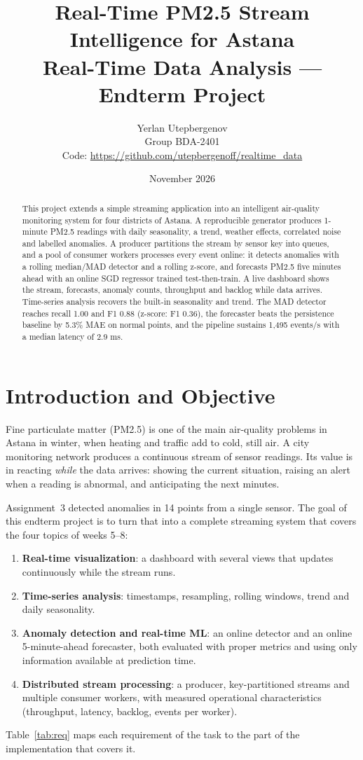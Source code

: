 \documentclass[11pt]{article}
\title{Real-Time PM2.5 Stream Intelligence for Astana\\\large Real-Time Data Analysis --- Endterm Project}
\author{Yerlan Utepbergenov\\Group BDA-2401\\\small Code: \url{https://github.com/utepbergenoff/realtime_data}}
\date{November 2026}
\begin{document}
\maketitle

\begin{abstract}
This project extends a simple streaming application into an intelligent air-quality monitoring system for four districts of Astana. A reproducible generator produces 1-minute PM2.5 readings with daily seasonality, a trend, weather effects, correlated noise and labelled anomalies. A producer partitions the stream by sensor key into queues, and a pool of consumer workers processes every event online: it detects anomalies with a rolling median/MAD detector and a rolling z-score, and forecasts PM2.5 five minutes ahead with an online SGD regressor trained test-then-train. A live dashboard shows the stream, forecasts, anomaly counts, throughput and backlog while data arrives. Time-series analysis recovers the built-in seasonality and trend. The MAD detector reaches recall 1.00 and F1 0.88 (z-score: F1 0.36), the forecaster beats the persistence baseline by 5.3\% MAE on normal points, and the pipeline sustains 1{,}495 events/s with a median latency of 2.9 ms.
\end{abstract}

\section{Introduction and Objective}
Fine particulate matter (PM2.5) is one of the main air-quality problems in Astana in winter, when heating and traffic add to cold, still air. A city monitoring network produces a continuous stream of sensor readings. Its value is in reacting \emph{while} the data arrives: showing the current situation, raising an alert when a reading is abnormal, and anticipating the next minutes.

Assignment~3 detected anomalies in 14 points from a single sensor. The goal of this endterm project is to turn that into a complete streaming system that covers the four topics of weeks 5--8:
\begin{enumerate}\itemsep0pt
\item \textbf{Real-time visualization}: a dashboard with several views that updates continuously while the stream runs.
\item \textbf{Time-series analysis}: timestamps, resampling, rolling windows, trend and daily seasonality.
\item \textbf{Anomaly detection and real-time ML}: an online detector and an online 5-minute-ahead forecaster, both evaluated with proper metrics and using only information available at prediction time.
\item \textbf{Distributed stream processing}: a producer, key-partitioned streams and multiple consumer workers, with measured operational characteristics (throughput, latency, backlog, events per worker).
\end{enumerate}
Table~\ref{tab:req} maps each requirement of the task to the part of the implementation that covers it.
\end{document}
